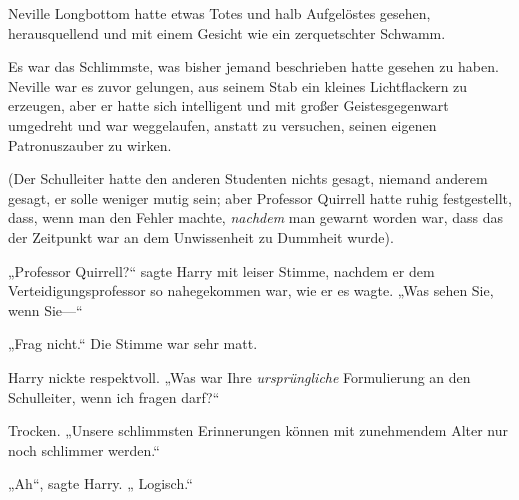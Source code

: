 \later

Neville Longbottom hatte etwas Totes und halb Aufgelöstes gesehen, herausquellend und mit einem Gesicht wie ein zerquetschter Schwamm.

Es war das Schlimmste, was bisher jemand beschrieben hatte gesehen zu haben. Neville war es zuvor gelungen, aus seinem Stab ein kleines Lichtflackern zu erzeugen, aber er hatte sich intelligent und mit großer Geistesgegenwart umgedreht und war weggelaufen, anstatt zu versuchen, seinen eigenen Patronuszauber zu wirken.

(Der Schulleiter hatte den anderen Studenten nichts gesagt, niemand anderem gesagt, er solle weniger mutig sein; aber Professor Quirrell hatte ruhig festgestellt, dass, wenn man den Fehler machte, \emph{nachdem} man gewarnt worden war, dass das der Zeitpunkt war an dem Unwissenheit zu Dummheit wurde).

„Professor Quirrell?“ sagte Harry mit leiser Stimme, nachdem er dem Verteidigungsprofessor so nahegekommen war, wie er es wagte. „Was sehen Sie, wenn Sie—“

„Frag nicht.“ Die Stimme war sehr matt.

Harry nickte respektvoll. „Was war Ihre \emph{ursprüngliche} Formulierung an den Schulleiter, wenn ich fragen darf?“

Trocken. „Unsere schlimmsten Erinnerungen können mit zunehmendem Alter nur noch schlimmer werden.“

„Ah“, sagte Harry. „ Logisch.“

